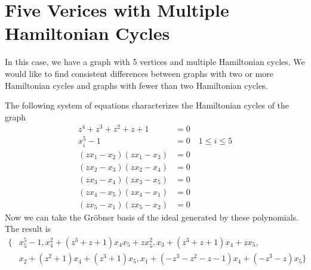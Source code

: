 \documentclass[letterpaper]{article}
\newcommand{\aln}[1]{\begin{align*} #1 \end{align*}} %
\begin{document}
\section{Five Verices with Multiple Hamiltonian Cycles}
In this case, we have a graph with 5 vertices and multiple Hamiltonian cycles. We would like to find consistent differences between graphs with two or more Hamiltonian cycles and graphs with fewer than two Hamiltonian cycles.
\begin{center}
\end{center}
The following system of equations characterizes the Hamiltonian cycles of the graph
\aln{
  z^4 + z^3 + z^2 + z + 1 &= 0\\
  x_i^5 - 1 &= 0 \quad 1 \leq i \leq 5\\
  (z x_1 - x_2)(z x_1 - x_3) &= 0\\
  (z x_2 - x_3)(z x_2 - x_4) &= 0\\
  (z x_3 - x_4)(z x_3 - x_5) &= 0\\
  (z x_4 - x_5)(z x_4 - x_1) &= 0\\
  (z x_5 - x_1)(z x_5 - x_2) &= 0
}
Now we can take the Gr\"obner basis of the ideal generated by these polynomials. The result is
\aln{
  \{& x_5^5-1, x_4^2+(z^3+z+1)x_4x_5+zx_5^2, x_3+(z^3+z+1)x_4+zx_5,\\& x_2+(z^2+1)x_4+(z^3+1)x_5, x_1+(-z^3-z^2-z-1)x_4+(-z^3-z)x_5\}
}

\newpage
\end{document}
